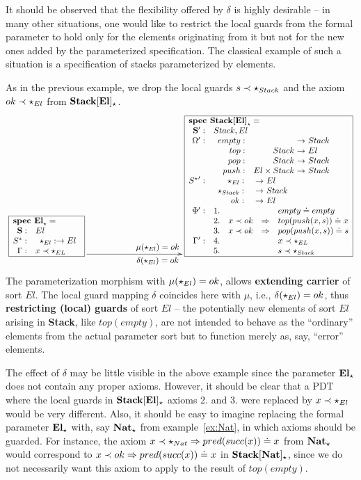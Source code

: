 It should be observed that the flexibility offered by $\delta$ is highly
desirable -- in many other situations, one would like
to restrict the local guards from the formal parameter to hold only for the
elements originating from it but not for the new ones added by the
parameterized specification. The classical example of such a situation is a
specification of 
stacks parameterized by elements.
%
\begin{example}\label{ex:stackelSP}
As in the previous example, we drop the local guards $s\prec\star_{Stack}$
and the axiom
$ok\prec\star_{El}$ from ${\bf Stack[El]_\star}$.
\[\xymatrix{
\frame{\txt{$\spec{
	\tit{\mbox{\bf spec\ El}_\cons^{{}}=} \\
		\spSort{El}
		\spOps{\allcons}{ \cons_{El}: \to El}
		\Gamma:
			& x \prec \cons_{EL}
}$}}
\ar[rrrr]^{\txt{$\large{\mu(\cons_{El})=ok}$}}_{\txt{$\large{\delta(\cons_{El})={ok}}$}} &&&&
\frame{\txt{$\spec{
	\tit{\mbox{\bf spec\ Stack[El]}_\cons^{{}}=} \\
		\spSorts{\Sorts'}{Stack,El}
		\spOps{\Ops'}{empty: && Stack\\
			top: & Stack & El\\
			pop: & Stack & Stack\\
			push: & El \times Stack & Stack}
		\spOps{{\allcons}'}{	\cons_{El}: && El \\
			\cons_{Stack}: && Stack \\
			ok:  && El}
		\Phi':
			&1.& && empty \eleq empty \\
			&2.& x \prec ok
				& \To & top(push(x,s)) \eleq x\\
			&3.& x \prec ok
				 & \To & pop(push(x,s)) \eleq s \\
		\Gamma':	&4.& && x \prec \cons_{EL}\\
			&5.& && s \prec \cons_{Stack} \\
}$}}
}
\]
The parameterization morphism with $\mu(\star_{El}) = ok$, allows {\bf extending
carrier} of sort $El$. The local guard mapping $\delta$ coincides here
with $\mu$, i.e., $\delta(\star_{El})=ok$, thus {\bf restricting (local)
guards} of sort $El$ -- the potentially new
elements of sort $El$ arising in {\bf Stack}, like $top(empty)$, are not
intended to behave as the ``ordinary'' elements from the 
actual parameter sort but to function merely as, say, ``error'' elements. 
\end{example}
The effect of $\delta$ may be little visible in the above example since the
parameter ${\bf El_\star}$ does not contain any proper axioms. However, it
should be clear that a PDT where the local guards in ${\bf Stack[El]_\star}$
axioms 2. and 3. were replaced by $x\prec\star_{El}$ would be very
different. Also, it should be easy to imagine replacing the formal parameter
${\bf El_\star}$ with, say ${\bf Nat_\star}$ from example~\ref{ex:Nat}, in which axioms 
should be guarded. For instance, the axiom  $x\prec \star_{Nat}\Rightarrow
pred(succ(x))\mathrel{\dot{=} } x$ from ${\bf Nat_\star}$
would correspond to $x\prec ok \Rightarrow pred(succ(x))\mathrel{\dot{=} } x$ in 
${\bf Stack[Nat]_\star}$, since we do not necessarily want this
axiom to apply to the result of $top(empty)$.

